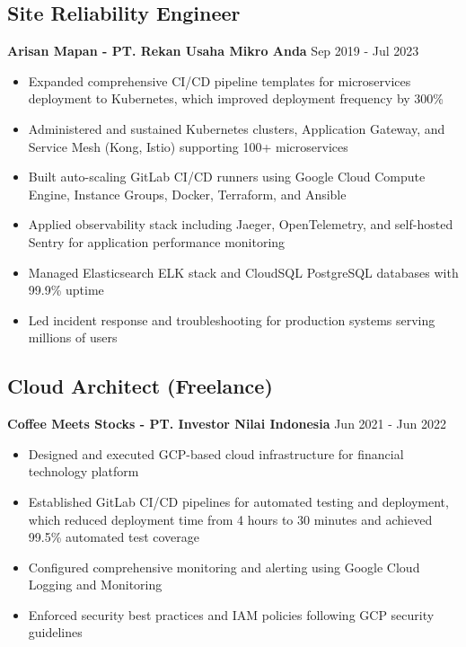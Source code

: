 \documentclass[11pt,a4paper]{article}
\newcommand{\company}[1]{\textbf{\color{primary}#1}}
\newcommand{\daterange}[1]{\color{secondary}#1}  %
\begin{document}
\subsection{Site Reliability Engineer}
\company{Arisan Mapan - PT. Rekan Usaha Mikro Anda} \hfill \daterange{Sep 2019 - Jul 2023}
\begin{itemize}[leftmargin=*, itemsep=2pt]
        \item Expanded comprehensive CI/CD pipeline templates for microservices deployment to Kubernetes, which improved deployment frequency by 300\%
        \item Administered and sustained Kubernetes clusters, Application Gateway, and Service Mesh (Kong, Istio) supporting 100+ microservices
    \item Built auto-scaling GitLab CI/CD runners using Google Cloud Compute Engine, Instance Groups, Docker, Terraform, and Ansible
        \item Applied observability stack including Jaeger, OpenTelemetry, and self-hosted Sentry for application performance monitoring
    \item Managed Elasticsearch ELK stack and CloudSQL PostgreSQL databases with 99.9\% uptime
    \item Led incident response and troubleshooting for production systems serving millions of users
\end{itemize}

\subsection{Cloud Architect (Freelance)}
\company{Coffee Meets Stocks - PT. Investor Nilai Indonesia} \hfill \daterange{Jun 2021 - Jun 2022}
\begin{itemize}[leftmargin=*, itemsep=2pt]
        \item Designed and executed GCP-based cloud infrastructure for financial technology platform
        \item Established GitLab CI/CD pipelines for automated testing and deployment, which reduced deployment time from 4 hours to 30 minutes and achieved 99.5\% automated test coverage
    \item Configured comprehensive monitoring and alerting using Google Cloud Logging and Monitoring
        \item Enforced security best practices and IAM policies following GCP security guidelines
\end{itemize}
\end{document}
